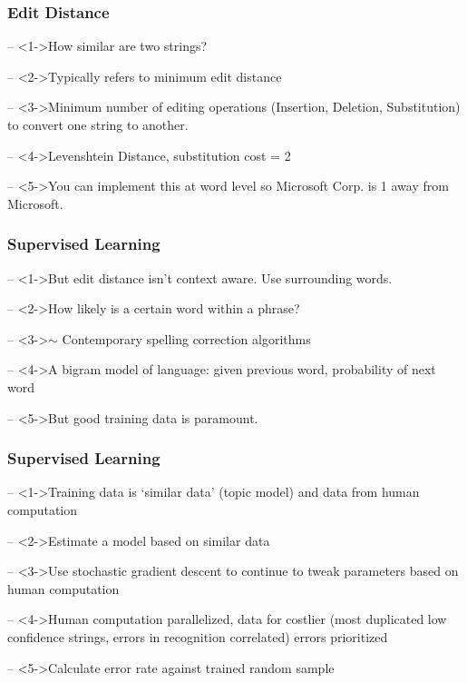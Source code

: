 \documentclass[compress, black]{beamer}
\begin{document}
\begin{frame}
	\frametitle{Edit Distance} 
	\begin{large_enum}
		\item[--]<1->How similar are two strings?
		\item[--]<2->Typically refers to minimum edit distance
		\item[--]<3->Minimum number of editing operations (Insertion, Deletion, Substitution) to convert one string to another.
		\item[--]<4->Levenshtein Distance, substitution cost = 2
		\item[--]<5->You can implement this at word level so Microsoft Corp. is 1 away from Microsoft.
	\end{large_enum}
\end{frame}

\begin{frame}
\frametitle{Supervised Learning}
	\begin{large_enum}
	\item[--]<1->But edit distance isn't context aware. Use surrounding words.
	\item[--]<2->How likely is a certain word within a phrase?  
	\item[--]<3->$\sim$ Contemporary spelling correction algorithms
	\item[--]<4->A bigram model of language: given previous word, probability of next word 
	\item[--]<5->But good training data is paramount.
	\end{large_enum}
\end{frame}

\begin{frame}
\frametitle{Supervised Learning}
	\begin{large_enum}
	\item[--]<1->Training data is `similar data' (topic model) and data from human computation
	\item[--]<2->Estimate a model based on similar data 
	\item[--]<3->Use stochastic gradient descent to continue to tweak parameters based on human computation
	\item[--]<4->Human computation parallelized, data for costlier (most duplicated low confidence strings, errors in recognition correlated) errors prioritized
	\item[--]<5->Calculate error rate against trained random sample
	\end{large_enum}
\end{frame}
\end{document}
